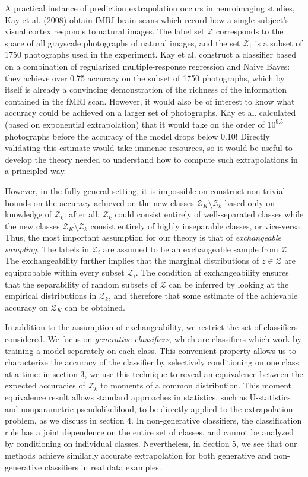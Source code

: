 \documentclass{article}
\begin{document}
A practical instance of prediction extrapolation occurs in neuroimaging studies,
Kay et al. (2008) obtain fMRI brain scans which record how a single subject's visual cortex responds to natural images.
The label set $\mathcal{Z}$ corresponds to the space of all grayscale photographs of natural images,
and the set $\mathcal{Z}_1$ is a subset of 1750 photographs used in the experiment.
Kay et al. construct a classifier based on a combination of regularized multiple-response regression
and Naive Bayes: they achieve over 0.75 accuracy on the subset of 1750 photographs,
which by itself is already a convincing demonstration of the richness of the information contained in the fMRI scan.
However, it would also be of interest to know what accuracy could be achieved on a larger set of photographs.
Kay et al. calculated (based on exponential extrapolation) that it would take on the order of $10^{9.5}$ photographs
before the accuracy of the model drops below 0.10!  Directly validating this estimate would take immense resources,
so it would be useful to develop the theory needed to understand how to compute such extrapolations
in a principled way. 

However, in the fully general setting, it is impossible on construct
non-trivial bounds on the accuracy achieved on the new classes $\mathcal{Z}_K \setminus \mathcal{Z}_k$
based only on knowledge of $\mathcal{Z}_k$: after all, $\mathcal{Z}_k$ could consist entirely of well-separated classes
while the new classes $\mathcal{Z}_K \setminus \mathcal{Z}_k$ consist entirely of highly inseparable classes, or vice-versa.
Thus, the most important assumption for our theory is that of \emph{exchangeable sampling}.
The labels in $\mathcal{Z}_i$ are assumed to be an exchangeable sample from $\mathcal{Z}$.
The exchangeability further implies that the marginal distributions of $z \in \mathcal{Z}$ 
are equiprobable within every subset $\mathcal{Z}_i$. 
The condition of exchangeability ensures that the separability of random subsets of $\mathcal{Z}$ can be inferred
by looking at the empirical distributions in $\mathcal{Z}_k$, and therefore that some estimate of the achievable
accuracy on $\mathcal{Z}_K$ can be obtained.

In addition to the assumption of exchangeability, we restrict the set of classifiers considered.
We focus on \emph{generative classifiers}, which are classifiers which work by training
a model separately on each class.  This convenient property 
allows us to characterize the accuracy of the classifier by selectively conditioning on one class at a time:
in section 3, we use this technique to reveal an equivalence between 
the expected accuracies of $\mathcal{Z}_k$ to moments of a common distribution.
This moment equivalence result allows standard approaches in statistics, such as U-statistics and
nonparametric pseudolikelilood, to be directly applied to the extrapolation problem, as we discuss in section 4.
In non-generative classifiers, the classification rule has a joint dependence on the entire set of classes,
and cannot be analyzed by conditioning on individual classes.
Nevertheless, in Section 5, we see that our methods achieve similarly accurate extrapolation for both
generative and non-generative classifiers in real data examples.
\end{document}

